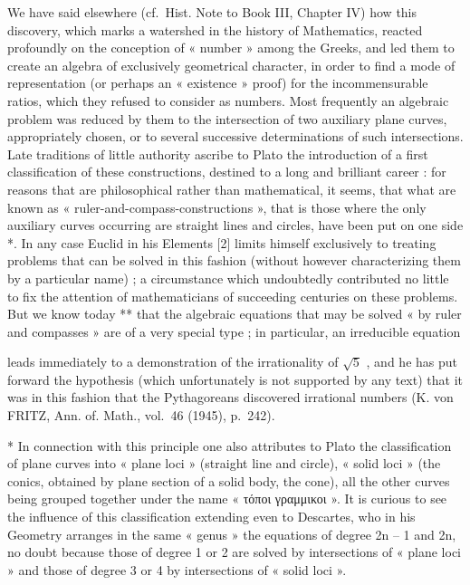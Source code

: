 We have said elsewhere (cf.~Hist. Note to Book III, Chapter IV) how this discovery, which marks a watershed in the history of Mathematics, reacted profoundly on the conception of « number » among the Greeks, and led them to create an algebra of exclusively geometrical character, in order to find a mode of representation (or perhaps an « existence » proof) for the incommensurable ratios, which they refused to consider as numbers. Most frequently an algebraic problem was reduced by them to the intersection of two auxiliary plane curves, appropriately chosen, or to several successive determinations of such intersections. Late traditions of little authority ascribe to Plato the introduction of a first classification of these constructions, destined to a long and brilliant career : for reasons that are philosophical rather than mathematical, it seems, that what are known as « ruler-and-compass-constructions », that is those where the only auxiliary curves occurring are straight lines and circles, have been put on one side *. In any case Euclid in his Elements {[}2{]} limits himself exclusively to treating problems that can be solved in this fashion (without however characterizing them by a particular name) ; a circumstance which undoubtedly contributed no little to fix the attention of mathematicians of succeeding centuries on these problems. But we know today ** that the algebraic equations that may be solved « by ruler and compasses » are of a very special type ; in particular, an irreducible equation

leads immediately to a demonstration of the irrationality of \(\sqrt{5}\) , and he has put forward the hypothesis (which unfortunately is not supported by any text) that it was in this fashion that the Pythagoreans discovered irrational numbers (K. von FRITZ, Ann. of. Math., vol.~46 (1945), p.~242).

* In connection with this principle one also attributes to Plato the classification of plane curves into « plane loci » (straight line and circle), « solid loci » (the conics, obtained by plane section of a solid body, the cone), all the other curves being grouped together under the name « τόποι γραμμικοι ». It is curious to see the influence of this classification extending even to Descartes, who in his Geometry arranges in the same « genus » the equations of degree 2n -- 1 and 2n, no doubt because those of degree 1 or 2 are solved by intersections of « plane loci » and those of degree 3 or 4 by intersections of « solid loci ».

